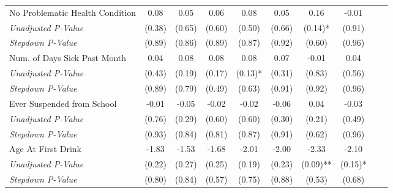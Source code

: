 \begin{tabular}{l c c c c c c c c c}
No Problematic Health Condition & 0.08 & 0.05 & 0.06 & 0.08 & 0.05 & 0.16 & -0.01 \\
\quad \textit{Unadjusted P-Value} & (0.38) & (0.65) & (0.60) & (0.50) & (0.66) & (0.14)* & (0.91) \\
\quad \textit{Stepdown P-Value} & (0.89) & (0.86) & (0.89) & (0.87) & (0.92) & (0.60) & (0.96) \\
Num. of Days Sick Past Month & 0.04 & 0.08 & 0.08 & 0.08 & 0.07 & -0.01 & 0.04 \\
\quad \textit{Unadjusted P-Value} & (0.43) & (0.19) & (0.17) & (0.13)* & (0.31) & (0.83) & (0.56) \\
\quad \textit{Stepdown P-Value} & (0.89) & (0.79) & (0.49) & (0.63) & (0.91) & (0.92) & (0.96) \\
Ever Suspended from School & -0.01 & -0.05 & -0.02 & -0.02 & -0.06 & 0.04 & -0.03 \\
\quad \textit{Unadjusted P-Value} & (0.76) & (0.29) & (0.60) & (0.60) & (0.30) & (0.21) & (0.49) \\
\quad \textit{Stepdown P-Value} & (0.93) & (0.84) & (0.81) & (0.87) & (0.91) & (0.62) & (0.96) \\
Age At First Drink & -1.83 & -1.53 & -1.68 & -2.01 & -2.00 & -2.33 & -2.10 \\
\quad \textit{Unadjusted P-Value} & (0.22) & (0.27) & (0.25) & (0.19) & (0.23) & (0.09)** & (0.15)* \\
\quad \textit{Stepdown P-Value} & (0.80) & (0.84) & (0.57) & (0.75) & (0.88) & (0.53) & (0.68) \\
\bottomrule
\end{tabular}
